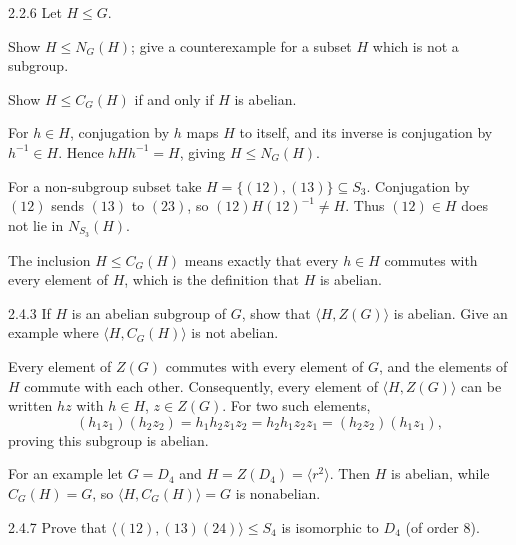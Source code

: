 \documentclass[11pt,oneside]{article}
\begin{document}
\begin{exercise}{2.2.6}
Let $H\le G$.
\begin{exercisesubparts}
\item Show $H\le N_G(H)$; give a counterexample for a subset $H$ which is not a subgroup.
\item Show $H\le C_G(H)$ if and only if $H$ is abelian.
\end{exercisesubparts}
\end{exercise}

\begin{solution}
\begin{exercisesubparts}
\item For $h\in H$, conjugation by $h$ maps $H$ to itself, and its inverse is conjugation by $h^{-1}\in H$. Hence $hHh^{-1}=H$, giving $H\le N_G(H)$.

For a non-subgroup subset take $H=\{(12),(13)\}\subseteq S_3$. Conjugation by $(12)$ sends $(13)$ to $(23)$, so $(12)H(12)^{-1}\ne H$. Thus $(12)\in H$ does not lie in $N_{S_3}(H)$.
\item The inclusion $H\le C_G(H)$ means exactly that every $h\in H$ commutes with every element of $H$, which is the definition that $H$ is abelian.
\end{exercisesubparts}
\end{solution}

\begin{exercise}{2.4.3}
If $H$ is an abelian subgroup of $G$, show that $\langle H,Z(G)\rangle$ is abelian. Give an example where $\langle H,C_G(H)\rangle$ is not abelian.
\end{exercise}

\begin{solution}
Every element of $Z(G)$ commutes with every element of $G$, and the elements of $H$ commute with each other. Consequently, every element of $\langle H,Z(G)\rangle$ can be written $hz$ with $h\in H$, $z\in Z(G)$. For two such elements,
\[
(h_1z_1)(h_2z_2)=h_1h_2z_1z_2=h_2h_1z_2z_1=(h_2z_2)(h_1z_1),
\]
proving this subgroup is abelian.

For an example let $G=D_4$ and $H=Z(D_4)=\langle r^2\rangle$. Then $H$ is abelian, while $C_G(H)=G$, so $\langle H,C_G(H)\rangle=G$ is nonabelian.
\end{solution}

\begin{exercise}{2.4.7}
Prove that $\langle(12),(13)(24)\rangle\le S_4$ is isomorphic to $D_4$ (of order $8$).
\end{exercise}
\end{document}
